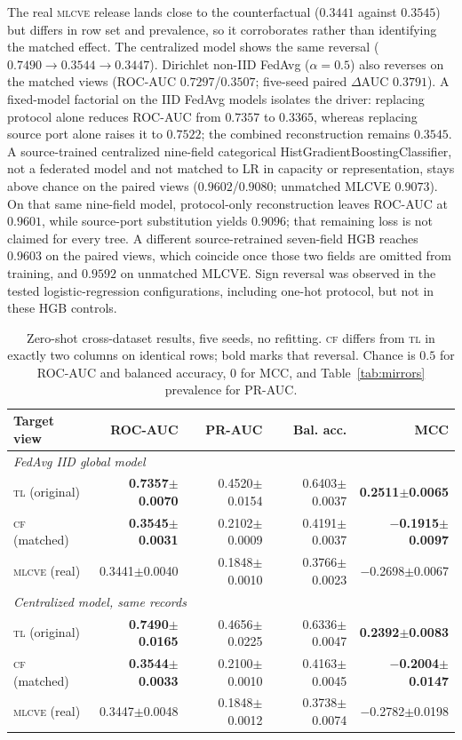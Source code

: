 \documentclass[conference,a4paper]{IEEEtran}
\begin{document}
The real \textsc{mlcve} release lands close to the counterfactual ($0.3441$ against $0.3545$) but differs in row set and prevalence, so it corroborates rather than identifying the matched effect. The centralized model shows the same reversal ($0.7490\rightarrow0.3544\rightarrow0.3447$). Dirichlet non-IID FedAvg ($\alpha=0.5$) also reverses on the matched views (ROC-AUC $0.7297$/$0.3507$; five-seed paired $\Delta$AUC $0.3791$). A fixed-model factorial on the IID FedAvg models isolates the driver: replacing protocol alone reduces ROC-AUC from $0.7357$ to $0.3365$, whereas replacing source port alone raises it to $0.7522$; the combined reconstruction remains $0.3545$. A source-trained centralized nine-field categorical HistGradientBoostingClassifier, not a federated model and not matched to LR in capacity or representation, stays above chance on the paired views ($0.9602$/$0.9080$; unmatched MLCVE $0.9073$). On that same nine-field model, protocol-only reconstruction leaves ROC-AUC at $0.9601$, while source-port substitution yields $0.9096$; that remaining loss is not claimed for every tree. A different source-retrained seven-field HGB reaches $0.9603$ on the paired views, which coincide once those two fields are omitted from training, and $0.9592$ on unmatched MLCVE. Sign reversal was observed in the tested logistic-regression configurations, including one-hot protocol, but not in these HGB controls.
\begin{table}[t]
\caption{Zero-shot cross-dataset results, five seeds, no refitting. \textsc{cf} differs from \textsc{tl} in exactly two columns on identical rows; bold marks that reversal. Chance is $0.5$ for ROC-AUC and balanced accuracy, $0$ for MCC, and Table~\ref{tab:mirrors} prevalence for PR-AUC.}\label{tab:cross}\centering\scriptsize\setlength{\tabcolsep}{2pt}
\begin{tabular}{lrrrr}\toprule
Target view&ROC-AUC&PR-AUC&Bal. acc.&MCC\\\midrule
\multicolumn{5}{l}{\textit{FedAvg IID global model}}\\
\textsc{tl} (original)&\textbf{0.7357$\pm$0.0070}&0.4520$\pm$0.0154&0.6403$\pm$0.0037&\textbf{0.2511$\pm$0.0065}\\
\textsc{cf} (matched)&\textbf{0.3545$\pm$0.0031}&0.2102$\pm$0.0009&0.4191$\pm$0.0037&\textbf{$-$0.1915$\pm$0.0097}\\
\textsc{mlcve} (real)&0.3441$\pm$0.0040&0.1848$\pm$0.0010&0.3766$\pm$0.0023&$-$0.2698$\pm$0.0067\\\midrule
\multicolumn{5}{l}{\textit{Centralized model, same records}}\\
\textsc{tl} (original)&\textbf{0.7490$\pm$0.0165}&0.4656$\pm$0.0225&0.6336$\pm$0.0047&\textbf{0.2392$\pm$0.0083}\\
\textsc{cf} (matched)&\textbf{0.3544$\pm$0.0033}&0.2100$\pm$0.0010&0.4163$\pm$0.0045&\textbf{$-$0.2004$\pm$0.0147}\\
\textsc{mlcve} (real)&0.3447$\pm$0.0048&0.1848$\pm$0.0012&0.3738$\pm$0.0074&$-$0.2782$\pm$0.0198\\\bottomrule
\end{tabular}\end{table}
\end{document}

